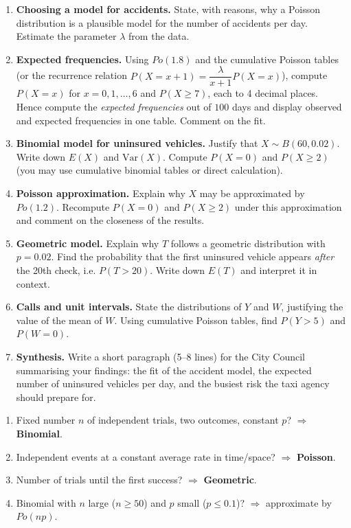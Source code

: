 \documentclass[11pt]{article}
\begin{document}
\begin{enumerate}
\item \textbf{Choosing a model for accidents.} State, with reasons, why a Poisson distribution is a plausible model for the number of accidents per day. Estimate the parameter $\lambda$ from the data.
\item \textbf{Expected frequencies.} Using $Po(1.8)$ and the cumulative Poisson tables (or the recurrence relation $P(X=x+1)=\dfrac{\lambda}{x+1}P(X=x)$), compute $P(X=x)$ for $x = 0, 1, \dots, 6$ and $P(X \geq 7)$, each to 4 decimal places. Hence compute the \emph{expected frequencies} out of $100$ days and display observed and expected frequencies in one table. Comment on the fit.
\item \textbf{Binomial model for uninsured vehicles.} Justify that $X \sim B(60, 0.02)$. Write down $E(X)$ and $\mathrm{Var}(X)$. Compute $P(X = 0)$ and $P(X \geq 2)$ (you may use cumulative binomial tables or direct calculation).
\item \textbf{Poisson approximation.} Explain why $X$ may be approximated by $Po(1.2)$. Recompute $P(X=0)$ and $P(X \geq 2)$ under this approximation and comment on the closeness of the results.
\item \textbf{Geometric model.} Explain why $T$ follows a geometric distribution with $p = 0.02$. Find the probability that the first uninsured vehicle appears \emph{after} the 20th check, i.e. $P(T > 20)$. Write down $E(T)$ and interpret it in context.
\item \textbf{Calls and unit intervals.} State the distributions of $Y$ and $W$, justifying the value of the mean of $W$. Using cumulative Poisson tables, find $P(Y > 5)$ and $P(W = 0)$.
\item \textbf{Synthesis.} Write a short paragraph (5--8 lines) for the City Council summarising your findings: the fit of the accident model, the expected number of uninsured vehicles per day, and the busiest risk the taxi agency should prepare for.
\end{enumerate}

\begin{methode}
\begin{enumerate}
\item Fixed number $n$ of independent trials, two outcomes, constant $p$? $\Rightarrow$ \textbf{Binomial}.
\item Independent events at a constant average rate in time/space? $\Rightarrow$ \textbf{Poisson}.
\item Number of trials until the first success? $\Rightarrow$ \textbf{Geometric}.
\item Binomial with $n$ large ($n \geq 50$) and $p$ small ($p \leq 0.1$)? $\Rightarrow$ approximate by $Po(np)$.
\end{enumerate}
\end{methode}
\end{document}
